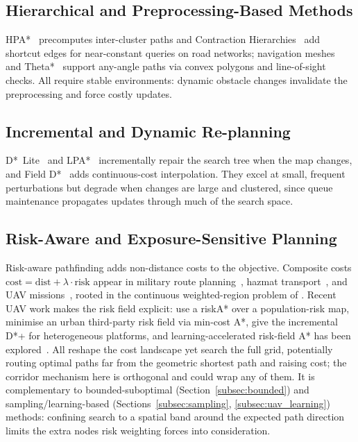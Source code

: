 \documentclass[preprint,12pt,authoryear]{elsarticle}
\begin{document}
\subsection{Hierarchical and Preprocessing-Based Methods}

HPA*~\citep{Botea2004} precomputes inter-cluster paths and Contraction Hierarchies~\citep{Geisberger2008} add shortcut edges for near-constant queries on road networks; navigation meshes~\citep{Tozour2002} and Theta*~\citep{Nash2007} support any-angle paths via convex polygons and line-of-sight checks. All require stable environments: dynamic obstacle changes invalidate the preprocessing and force costly updates.

\subsection{Incremental and Dynamic Re-planning}

D*~Lite~\citep{Koenig2002} and LPA*~\citep{Koenig2004} incrementally repair the search tree when the map changes, and Field D*~\citep{Ferguson2005} adds continuous-cost interpolation. They excel at small, frequent perturbations but degrade when changes are large and clustered, since queue maintenance propagates updates through much of the search space.

\subsection{Risk-Aware and Exposure-Sensitive Planning}

Risk-aware pathfinding adds non-distance costs to the objective. Composite costs $\mathrm{cost} = \mathrm{dist} + \lambda \cdot \mathrm{risk}$ appear in military route planning~\citep{Rowe1990}, hazmat transport~\citep{Erkut1998}, and UAV missions~\citep{Aggarwal2020}, rooted in the continuous weighted-region problem of \citet{Mitchell1991}. Recent UAV work makes the risk field explicit: \citet{Primatesta2019} use a riskA* over a population-risk map, \citet{Tang2023} minimise an urban third-party risk field via min-cost A*, \citet{Karlsson2023} give the incremental D*+ for heterogeneous platforms, and learning-accelerated risk-field A* has been explored~\citep{Xiang2024}. All reshape the cost landscape yet search the full grid, potentially routing optimal paths far from the geometric shortest path and raising cost; the corridor mechanism here is orthogonal and could wrap any of them. It is complementary to bounded-suboptimal (Section~\ref{subsec:bounded}) and sampling/learning-based (Sections~\ref{subsec:sampling}, \ref{subsec:uav_learning}) methods: confining search to a spatial band around the expected path direction limits the extra nodes risk weighting forces into consideration.
\end{document}
